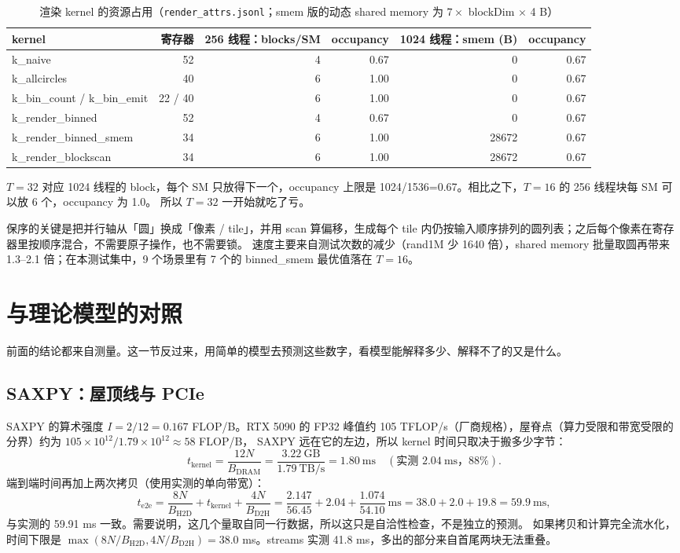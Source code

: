 \documentclass[11pt,a4paper]{ctexart}
\begin{document}
\begin{table}[H]
\centering\small
\caption{渲染 kernel 的资源占用（\texttt{render\_attrs.jsonl}；smem 版的动态 shared memory 为 $7\times$ blockDim $\times$ 4 B）}\label{tab:renderattrs}
\setlength{\tabcolsep}{4pt}
\begin{tabular}{lrrrrr}
\toprule
kernel & 寄存器 & 256 线程：blocks/SM & occupancy & 1024 线程：smem (B) & occupancy \\
\midrule
k\_naive & 52 & 4 & 0.67 & 0 & 0.67 \\
k\_allcircles & 40 & 6 & 1.00 & 0 & 0.67 \\
k\_bin\_count / k\_bin\_emit & 22 / 40 & 6 & 1.00 & 0 & 0.67 \\
k\_render\_binned & 52 & 4 & 0.67 & 0 & 0.67 \\
k\_render\_binned\_smem & 34 & 6 & 1.00 & 28672 & 0.67 \\
k\_render\_blockscan & 34 & 6 & 1.00 & 28672 & 0.67 \\
\bottomrule
\end{tabular}
\end{table}
$T=32$ 对应 1024 线程的 block，每个 SM 只放得下一个，occupancy 上限是 1024/1536=0.67。相比之下，$T=16$ 的 256 线程块每 SM 可以放 6 个，occupancy 为 1.0。
所以 $T=32$ 一开始就吃了亏。

\begin{findingbox}[：渲染器]
保序的关键是把并行轴从「圆」换成「像素 / tile」，并用 scan 算偏移，生成每个 tile 内仍按输入顺序排列的圆列表；之后每个像素在寄存器里按顺序混合，不需要原子操作，也不需要锁。
速度主要来自测试次数的减少（rand1M 少 1640 倍），shared memory 批量取圆再带来 1.3--2.1 倍；在本测试集中，9 个场景里有 7 个的 binned\_smem 最优值落在 $T=16$。
\end{findingbox}

\section{与理论模型的对照}

前面的结论都来自测量。这一节反过来，用简单的模型去预测这些数字，看模型能解释多少、解释不了的又是什么。

\subsection{SAXPY：屋顶线与 PCIe}
SAXPY 的算术强度 $I=2/12=0.167$ FLOP/B。RTX 5090 的 FP32 峰值约 105 TFLOP/s（厂商规格），屋脊点（算力受限和带宽受限的分界）约为 $105\times10^{12}/1.79\times10^{12}\approx58$ FLOP/B，
SAXPY 远在它的左边，所以 kernel 时间只取决于搬多少字节：
\[
t_\text{kernel}=\frac{12N}{B_\text{DRAM}}=\frac{3.22\ \text{GB}}{1.79\ \text{TB/s}}=1.80\ \text{ms}\quad(\text{实测 }2.04\ \text{ms，88\%}).
\]
端到端时间再加上两次拷贝（使用实测的单向带宽）：
\[
t_\text{e2e}=\frac{8N}{B_\text{H2D}}+t_\text{kernel}+\frac{4N}{B_\text{D2H}}
=\frac{2.147}{56.45}+2.04+\frac{1.074}{54.10}\ \text{ms}=38.0+2.0+19.8=59.9\ \text{ms},
\]
与实测的 59.91 ms 一致。需要说明，这几个量取自同一行数据，所以这只是自洽性检查，不是独立的预测。
如果拷贝和计算完全流水化，时间下限是 $\max(8N/B_\text{H2D},4N/B_\text{D2H})=38.0$ ms。streams 实测 41.8 ms，多出的部分来自首尾两块无法重叠。
\end{document}
